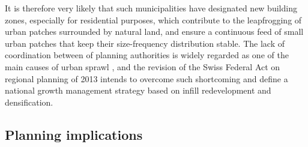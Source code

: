 \documentclass[10pt,letterpaper]{article}
\begin{document}
It is therefore very likely that such municipalities have designated new building zones, especially for residential purposes, which contribute to the leapfrogging of urban patches surrounded by natural land, and ensure a continuous feed of small urban patches that keep their size-frequency distribution stable.
The lack of coordination between of planning authorities is widely regarded as one of the main causes of urban sprawl \cite{carruthers2002fragmentation, mann2009institutional}, and the revision of the Swiss Federal Act on regional planning of 2013 intends to overcome such shortcoming and define a national growth management strategy based on infill redevelopment and densification.

\subsection*{Planning implications}
\end{document}
